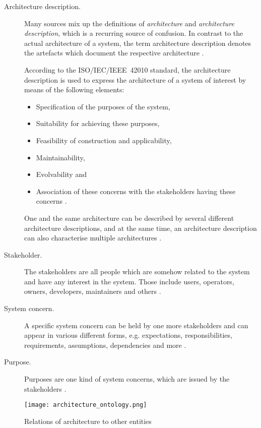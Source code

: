 \begin{description}
\item [Architecture description.]
	Many sources mix up the definitions of \emph{architecture} and \emph{architecture description}, which is a recurring source of confusion. In contrast to the actual architecture of a system, the term architecture description denotes the artefacts which document the respective architecture \cite{ISO_42010}.

	According to the \mbox{ISO/IEC/IEEE 42010} standard, the architecture description is used to express the architecture of a system of interest by means of the following elements:
	\begin{itemize}
	\item Specification of the purposes of the system,
	\item Suitability for achieving these purposes,
	\item Feasibility of construction and applicability,
	\item Maintainability,
	\item Evolvability and
	\item Association of these concerns with the stakeholders having these concerns \cite{ISO_42010}.
	\end{itemize}
	One and the same architecture can be described by several different architecture descriptions, and at the same time, an architecture description can also characterise multiple architectures \cite{ISO_42010}.

\item [Stakeholder.]
	The stakeholders are all people which are somehow related to the system and have any interest in the system. Those include users, operators, owners, developers, maintainers and others \cite{ISO_42010}.

\item [System concern.]
	A specific system concern can be held by one more stakeholders and can appear in various different forms, e.g. expectations, responsibilities, requirements, assumptions, dependencies and more \cite{ISO_42010}. 

\item [Purpose.]
	Purposes are one kind of system concerns, which are issued by the stakeholders \cite{ISO_42010}.
\end{description}

\begin{figure}[!htbp]
\centering
\texttt{[image: architecture\_ontology.png]}
\caption{Relations of architecture to other entities \cite{ISO_42010}}
\label{fig:architecture_ontology}
\end{figure}










